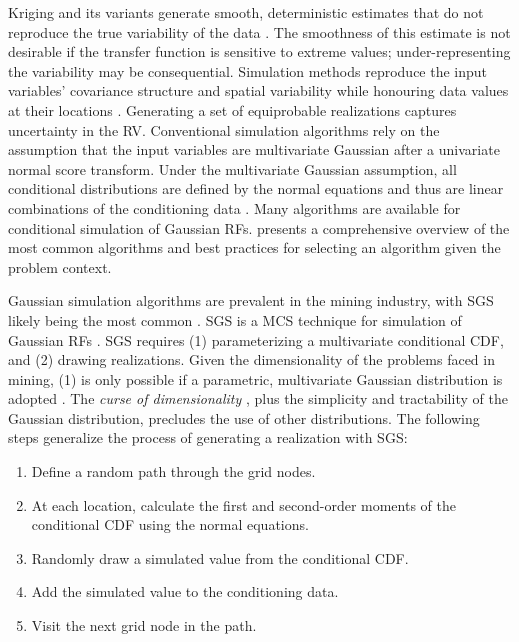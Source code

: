 Kriging and its variants generate smooth, deterministic estimates that do not reproduce the true variability of the data \citep{deutsch1992geostatistical}. The smoothness of this estimate is not desirable if the transfer function is sensitive to extreme values; under-representing the variability may be consequential. Simulation methods reproduce the input variables' covariance structure and spatial variability while honouring data values at their locations \citep{goovaerts1997geostatistics}. Generating a set of equiprobable realizations captures uncertainty in the \gls{RV}. Conventional simulation algorithms rely on the assumption that the input variables are multivariate Gaussian after a univariate normal score transform. Under the multivariate Gaussian assumption, all conditional distributions are defined by the normal equations and thus are linear combinations of the conditioning data \citep{chiles2012geostatistics}. Many algorithms are available for conditional simulation of Gaussian \glspl{RF}. \cite{pinto2020independent} presents a comprehensive overview of the most common algorithms and best practices for selecting an algorithm given the problem context.

Gaussian simulation algorithms are prevalent in the mining industry, with \gls{SGS} likely being the most common \citep{rossi2013mineral}. \Gls{SGS} is a \gls{MCS} technique for simulation of Gaussian \glspl{RF} \citep{gomez-hernandez1993joint,isaaks1990application,goovaerts1997geostatistics,gomez-hernandez2021one}. \Gls{SGS} requires (1) parameterizing a multivariate conditional \gls{CDF}, and (2) drawing realizations. Given the dimensionality of the problems faced in mining, (1) is only possible if a parametric, multivariate Gaussian distribution is adopted \citep{leuangthong2008solved}. The \textit{curse of dimensionality} \citep{bellman1961adaptive}, plus the simplicity and tractability of the Gaussian distribution, precludes the use of other distributions. The following steps generalize the process of generating a realization with \gls{SGS}:
\begin{enumerate}[noitemsep]
    \item Define a random path through the grid nodes.
    \item At each location, calculate the first and second-order moments of the conditional \gls{CDF} using the normal equations.
    \item Randomly draw a simulated value from the conditional \gls{CDF}.
    \item Add the simulated value to the conditioning data.
    \item Visit the next grid node in the path.
\end{enumerate}

